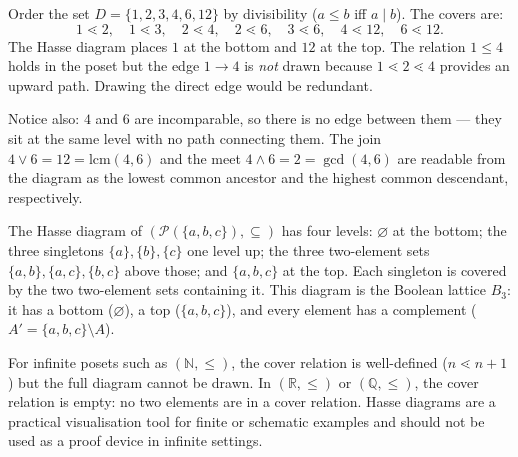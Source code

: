\begin{example*}[Divisibility on $\{1,2,3,4,6,12\}$]
\label{ex:hasse-divisibility}
Order the set $D = \{1, 2, 3, 4, 6, 12\}$ by divisibility ($a \leq b$ iff
$a \mid b$).  The covers are:
\[
  1 \lessdot 2,\quad
  1 \lessdot 3,\quad
  2 \lessdot 4,\quad
  2 \lessdot 6,\quad
  3 \lessdot 6,\quad
  4 \lessdot 12,\quad
  6 \lessdot 12.
\]
The Hasse diagram places $1$ at the bottom and $12$ at the top.  The relation
$1 \leq 4$ holds in the poset but the edge $1 \to 4$ is \emph{not} drawn
because $1 \lessdot 2 \lessdot 4$ provides an upward path.  Drawing the direct
edge would be redundant.

Notice also: $4$ and $6$ are incomparable, so there is no edge between them ---
they sit at the same level with no path connecting them.  The join
$4 \vee 6 = 12 = \mathrm{lcm}(4,6)$ and the meet $4 \wedge 6 = 2 = \gcd(4,6)$
are readable from the diagram as the lowest common ancestor and the highest
common descendant, respectively.
\end{example*}

\begin{example*}
\label{ex:hasse-power-set}
The Hasse diagram of $(\mathcal{P}(\{a,b,c\}), \subseteq)$ has four levels:
$\varnothing$ at the bottom; the three singletons $\{a\},\{b\},\{c\}$ one
level up; the three two-element sets $\{a,b\},\{a,c\},\{b,c\}$ above those;
and $\{a,b,c\}$ at the top.  Each singleton is covered by the two two-element
sets containing it.  This diagram is the Boolean lattice $B_3$: it has a
bottom ($\varnothing$), a top ($\{a,b,c\}$), and every element has a complement
($A' = \{a,b,c\} \setminus A$).
\end{example*}

\begin{remark*}
\label{rem:hasse-infinite}
For infinite posets such as $(\mathbb{N}, \leq)$, the cover relation is
well-defined ($n \lessdot n+1$) but the full diagram cannot be drawn.  In
$(\mathbb{R}, \leq)$ or $(\mathbb{Q}, \leq)$, the cover relation is empty:
no two elements are in a cover relation.  Hasse diagrams are a practical
visualisation tool for finite or schematic examples and should not be used
as a proof device in infinite settings.
\end{remark*}


